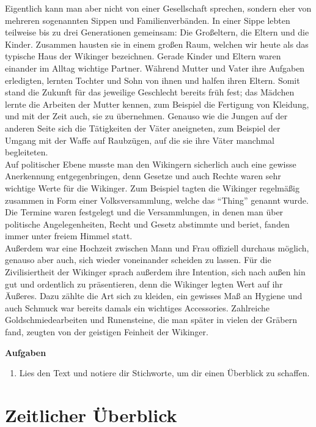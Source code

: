 \documentclass[12pt,a4paper,ngerman,openany]{book}
\newcommand{\aufgaben}[1]{
  \begin{tcolorbox}
    \textbf{Aufgaben}
    \begin{enumerate}
      #1
    \end{enumerate}
  \end{tcolorbox}
}
\begin{document}
Eigentlich kann man aber nicht von einer Gesellschaft sprechen, sondern eher von mehreren sogenannten Sippen und Familienverbänden. In einer Sippe lebten teilweise bis zu drei Generationen gemeinsam: Die Großeltern, die Eltern und die Kinder.
Zusammen hausten sie in einem großen Raum, welchen wir heute als das typische Haus der Wikinger bezeichnen. Gerade Kinder und Eltern waren einander im Alltag wichtige Partner. Während Mutter und Vater ihre Aufgaben erledigten,
lernten Tochter und Sohn von ihnen und halfen ihren Eltern. Somit stand die Zukunft für das jeweilige Geschlecht bereits früh fest; das Mädchen lernte die Arbeiten der Mutter kennen, zum Beispiel die Fertigung von Kleidung, und mit der Zeit auch, sie zu übernehmen.
Genauso wie die Jungen auf der anderen Seite sich die Tätigkeiten der Väter aneigneten, zum Beispiel der Umgang mit der Waffe auf Raubzügen, auf die sie ihre Väter manchmal begleiteten.\\
Auf politischer Ebene musste man den Wikingern sicherlich auch eine gewisse Anerkennung entgegenbringen, denn Gesetze und auch Rechte waren sehr wichtige Werte für die Wikinger. Zum Beispiel tagten die Wikinger regelmäßig zusammen in Form einer Volksversammlung,
welche das “Thing” genannt wurde. Die Termine waren festgelegt und die Versammlungen, in denen man über politische Angelegenheiten, Recht und Gesetz abstimmte und beriet, fanden immer unter freiem Himmel statt.\\
Außerdem war eine Hochzeit zwischen Mann und Frau offiziell durchaus möglich, genauso aber auch, sich wieder voneinander scheiden zu lassen. 
Für die Zivilisiertheit der Wikinger sprach außerdem ihre Intention, sich nach außen hin gut und ordentlich zu präsentieren, denn die Wikinger legten Wert auf ihr Äußeres. Dazu zählte die Art sich zu kleiden,
ein gewisses Maß an Hygiene und auch Schmuck war bereits damals ein wichtiges Accessories. Zahlreiche Goldschmiedearbeiten und Runensteine, die man später in vielen der Gräbern fand, zeugten von der geistigen Feinheit der Wikinger. 

\aufgaben {
  \item Lies den Text und notiere dir Stichworte, um dir einen Überblick zu schaffen.
}

\section{Zeitlicher Überblick}

\end{document}

